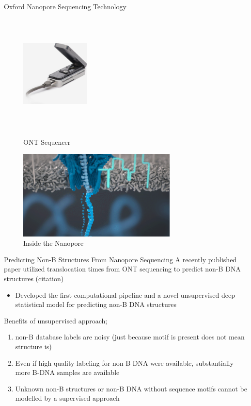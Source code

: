 \documentclass{beamer}
\begin{document}
	\begin{frame}{Oxford Nanopore Sequencing Technology}
		\centering
		\begin{figure}[!htb]
			\centering
			\begin{minipage}{.3\textwidth}
				\centering
				\includegraphics[width=3.5cm, height=6cm]{ont_machine.jpg}
				\caption{ONT Sequencer}
				\label{fig:prob1_6_2}
			\end{minipage}%
			\begin{minipage}{0.7\textwidth}
				\centering
				\includegraphics[width=8cm, height=4.5cm]{nanopore.png}
				\caption{Inside the Nanopore}
				\label{fig:prob1_6_1}
			\end{minipage}
		\end{figure}
		
	\end{frame}

	\begin{frame}{Predicting Non-B Structures From Nanopore Sequencing}
		A recently published paper utilized translocation times from ONT sequencing to predict non-B DNA structures (citation)
		\begin{itemize}
			\item Developed the first computational pipeline and a novel unsupervised deep statistical model for predicting non-B DNA structures \newline
		\end{itemize}
	
		Benefits  of unsupervised approach;
		\begin{enumerate}
			\item non-B database labels are noisy (just because motif is present does not mean structure is)
			\item Even if high quality labeling for non-B DNA were available, substantially more B-DNA samples are available
			\item Unknown non-B structures or non-B DNA without sequence motifs cannot be modelled by a supervised approach
		\end{enumerate}
	\end{frame}
\end{document}
